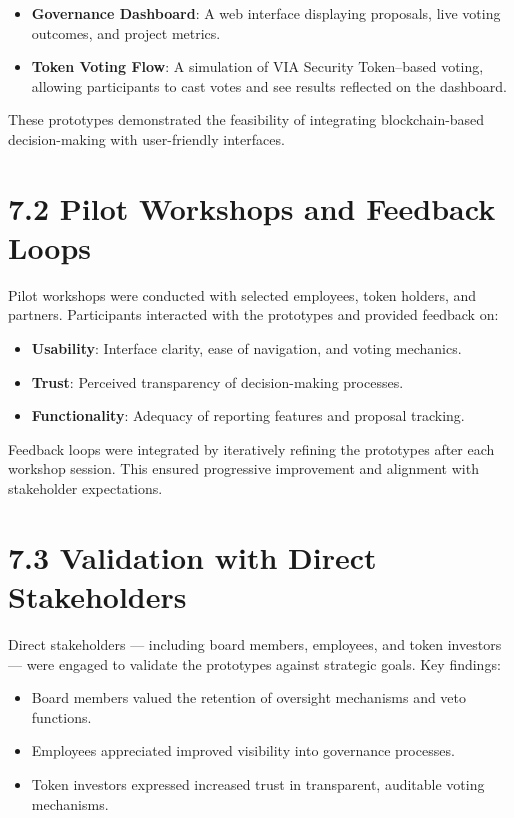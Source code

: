 \documentclass[
  english,
  12pt,
  oneside,
  open=any]{scrbook}
\providecommand{\tightlist}{%
  \setlength{\itemsep}{0pt}\setlength{\parskip}{0pt}}\usepackage{longtable,booktabs,array}
\begin{document}
\begin{itemize}
\tightlist
\item
  \textbf{Governance Dashboard}: A web interface displaying proposals,
  live voting outcomes, and project metrics.\\
\item
  \textbf{Token Voting Flow}: A simulation of VIA Security Token--based
  voting, allowing participants to cast votes and see results reflected
  on the dashboard.
\end{itemize}

These prototypes demonstrated the feasibility of integrating
blockchain-based decision-making with user-friendly interfaces.

\section{7.2 Pilot Workshops and Feedback Loops}\label{sec-workshops}

Pilot workshops were conducted with selected employees, token holders,
and partners. Participants interacted with the prototypes and provided
feedback on:

\begin{itemize}
\tightlist
\item
  \textbf{Usability}: Interface clarity, ease of navigation, and voting
  mechanics.\\
\item
  \textbf{Trust}: Perceived transparency of decision-making processes.\\
\item
  \textbf{Functionality}: Adequacy of reporting features and proposal
  tracking.
\end{itemize}

Feedback loops were integrated by iteratively refining the prototypes
after each workshop session. This ensured progressive improvement and
alignment with stakeholder expectations.

\section{7.3 Validation with Direct Stakeholders}\label{sec-direct}

Direct stakeholders --- including board members, employees, and token
investors --- were engaged to validate the prototypes against strategic
goals. Key findings:

\begin{itemize}
\tightlist
\item
  Board members valued the retention of oversight mechanisms and veto
  functions.\\
\item
  Employees appreciated improved visibility into governance processes.\\
\item
  Token investors expressed increased trust in transparent, auditable
  voting mechanisms.
\end{itemize}
\end{document}
